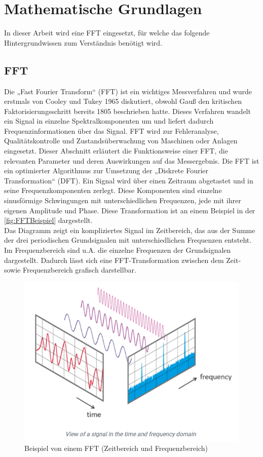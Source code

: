 \section{Mathematische Grundlagen}

In dieser Arbeit wird eine FFT eingesetzt, für welche das folgende Hintergrundwissen zum Verständnis benötigt wird.
\subsection{FFT}
\cite{NTIAudioFFT}\cite{WeissteinFFT}

Die „Fast Fourier Transform“ (FFT) ist ein wichtiges Messverfahren und wurde erstmals von Cooley und Tukey 1965 diskutiert, obwohl Gauß den kritischen Faktorisierungsschritt bereits 1805 beschrieben hatte. Dieses Verfahren wandelt ein Signal in einzelne Spektralkomponenten um und liefert dadurch Frequenzinformationen über das Signal. FFT wird zur Fehleranalyse, Qualitätskontrolle und Zustandsüberwachung von Maschinen oder Anlagen eingesetzt. Dieser Abschnitt erläutert die Funktionsweise einer FFT, die relevanten Parameter und deren Auswirkungen auf das Messergebnis.
Die FFT ist ein optimierter Algorithmus zur Umsetzung der „Diskrete Fourier Transformation“ (DFT). Ein Signal wird über einen Zeitraum abgetastet und in seine Frequenzkomponenten zerlegt. Diese Komponenten sind einzelne sinusförmige Schwingungen mit unterschiedlichen Frequenzen, jede mit ihrer eigenen Amplitude und Phase. Diese Transformation ist an einem Beispiel in der \autoref{fig:FFTBeispiel} dargestellt.\\
Das Diagramm zeigt ein kompliziertes Signal im Zeitbereich, das aus der Summe der drei periodischen Grundsignalen mit unterschiedlichen Frequenzen entsteht. Im Frequenzbereich sind u.A. die einzelne Frequenzen der Grundsignalen dargestellt. Dadurch lässt sich eine FFT-Transformation zwischen dem Zeit- sowie Frequenzbereich grafisch darstellbar.

\begin{figure}[H]
	\centering
	\includegraphics[width=0.5\linewidth]{Bilder/FFTBeispiel.png}
	\caption{Beispiel von einem FFT (Zeitbereich und Frequenzbereich)\cite{NTIAudioFFT}}
	\label{fig:FFTBeispiel}
\end{figure}

